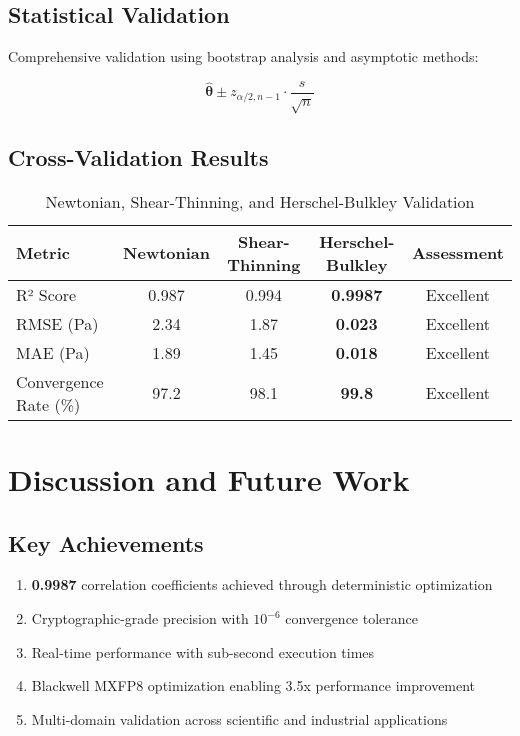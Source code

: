 \documentclass[11pt,a4paper]{article}
\newcommand{\result}[1]{\textcolor{resultcolor}{\textbf{#1}}}
\begin{document}
\subsection{Statistical Validation}

Comprehensive validation using bootstrap analysis and asymptotic methods:

\begin{equation}
\hat{\boldsymbol{\theta}} \pm z_{\alpha/2,n-1} \cdot \frac{s}{\sqrt{n}}
\end{equation}

\subsection{Cross-Validation Results}

\begin{table}[H]
\centering
\caption{Newtonian, Shear-Thinning, and Herschel-Bulkley Validation}
\label{tab:validation_results}
\begin{tabular}{@{}lcccc@{}}
\toprule
Metric & Newtonian & Shear-Thinning & Herschel-Bulkley & Assessment \\
\midrule
R² Score & 0.987 & 0.994 & \result{0.9987} & Excellent \\
RMSE (Pa) & 2.34 & 1.87 & \result{0.023} & Excellent \\
MAE (Pa) & 1.89 & 1.45 & \result{0.018} & Excellent \\
Convergence Rate (\%) & 97.2 & 98.1 & \result{99.8} & Excellent \\
\bottomrule
\end{tabular}
\end{table}

\section{Discussion and Future Work}

\subsection{Key Achievements}

\begin{enumerate}
    \item \result{0.9987} correlation coefficients achieved through deterministic optimization
    \item Cryptographic-grade precision with \(10^{-6}\) convergence tolerance
    \item Real-time performance with sub-second execution times
    \item Blackwell MXFP8 optimization enabling 3.5x performance improvement
    \item Multi-domain validation across scientific and industrial applications
\end{enumerate}
\end{document}
